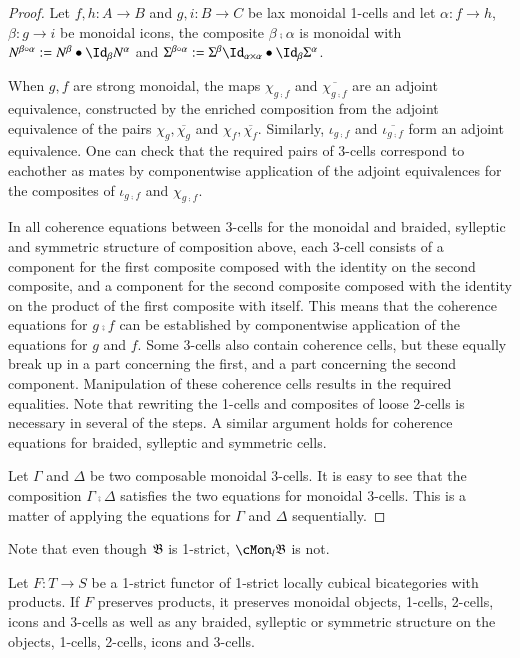 \begin{proof}
Let $f,h: A \rightarrow B $ and $g,i: B \rightarrow C$ be lax monoidal 1-cells and let $\alpha: f \rightarrow h$, $\beta: g \rightarrow i$ be monoidal icons, the composite $\beta \comp \alpha$ is monoidal with $N^{\beta \comp \alpha}:= N^{\beta} \horc \looseid_{\beta} N^{\alpha}$ and $\Sigma^{\beta \comp \alpha}:= \Sigma^{\beta}\looseid_{\alpha \times \alpha} \horc \looseid_{\beta} \Sigma^{\alpha}$.

When $g,f$ are strong monoidal, the maps $\chi_{g \comp f}$ and $\overline{\chi_{g \comp f}}$ are an adjoint equivalence, constructed by the enriched composition from the adjoint equivalence of the pairs $\chi_g, \overline{\chi_g}$ and $\chi_f, \overline{\chi_f}$. Similarly, $\iota_{g \comp f}$ and $\overline{\iota_{g \comp f}}$ form an adjoint equivalence. One can check that the required pairs of 3-cells correspond to eachother as mates by componentwise application of the adjoint equivalences for the composites of $\iota_{g \comp f}$ and $\chi_{g \comp f}$.

In all coherence equations between 3-cells for the monoidal and braided, sylleptic and symmetric structure of composition above, each 3-cell consists of a component for the first composite  composed with the identity on the second composite, and a component for the second composite composed with the identity on the product of the first composite with itself. This means that the coherence equations for $g \comp f$  can be established by componentwise application of the equations for $g$ and $f$. Some 3-cells also contain coherence cells, but these equally break up in a part concerning the first, and a part concerning the second component. Manipulation of these coherence cells results in the required equalities. Note that rewriting the 1-cells and composites of loose 2-cells is necessary in several of the steps. A similar argument holds for coherence equations for braided, sylleptic and symmetric cells.

Let $\Gamma$ and $\Delta$ be two composable monoidal 3-cells. It is easy to see that the composition $\Gamma \comp \Delta$ satisfies the two equations for monoidal 3-cells. This is a matter of applying the equations for $\Gamma$ and $\Delta$ sequentially.
\end{proof}

\begin{rmk}
  Note that even though $\mathfrak{B}$ is 1-strict, $\cMon_l\fB$ is not.
\end{rmk}

 \begin{lem}\label{lem:funcmonob}
   Let $F: T \rightarrow S$ be a 1-strict functor of 1-strict locally cubical bicategories with products.
   If $F$ preserves products, it preserves  monoidal objects, 1-cells, 2-cells, icons and 3-cells as well as any braided, sylleptic or symmetric structure on the objects, 1-cells, 2-cells, icons and 3-cells.
 \end{lem}
 
